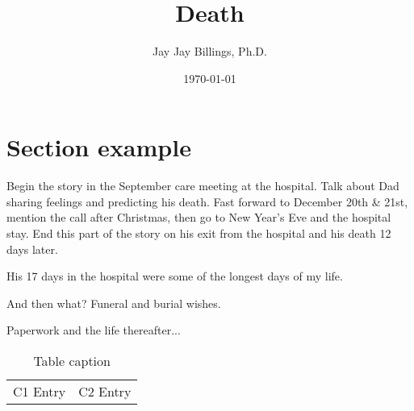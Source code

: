 \documentclass{article}
\title{Death}
\author{Jay Jay Billings, Ph.D.}
\date{\today}
\begin{document}
\maketitle

\section*{Section example}


Begin the story in the September care meeting at the hospital. Talk about Dad sharing feelings and predicting his death. Fast forward to December 20th & 21st, mention the call after Christmas, then go to New Year's Eve and the hospital stay. End this part of the story on his exit from the hospital and his death 12 days later.

His 17 days in the hospital were some of the longest days of my life.

And then what? Funeral and burial wishes.

Paperwork and the life thereafter...

\begin{table}[h!]
\centering
\begin{tabularx}{ 0.8\textwidth }{ | >{\raggedright\arraybackslash}X | >{\centering\arraybackslash}X | }
 \hline
 \multicolumn{2}{|c|}{Table title} \\
 \hline
 C1 Entry & C2 Entry \\
 \hline
\end{tabularx}
\caption{Table caption}
\end{table}
\end{document}
